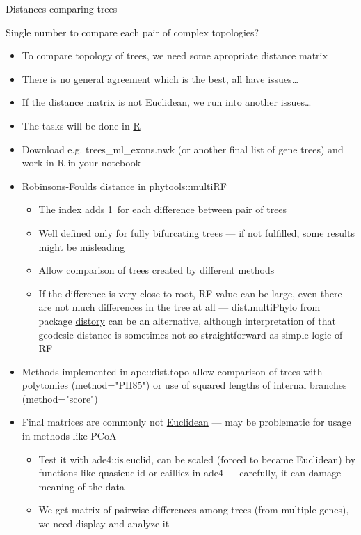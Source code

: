 \documentclass[compress, ucs, xelatex, 11pt, xcolor=x11names, aspectratio=169,
	hyperref={
		bookmarks=true,
		unicode=true,
		colorlinks=true,
		pdftitle={HybSeq course},
		plainpages=false,
		pdfauthor={Vojtech Zeisek},
		pdfsubject={Practical processing of HybSeq target enrichment sequencing data on computing grids like MetaCentrum},
		pdfcreator={XeLaTeX},
		pdfkeywords={BASH, command line, GNU, HybSeq, Linux, MetaCentrum, sequencing shell, target enrichment},
		linkcolor=Cyan2, %
		anchorcolor=Firebrick2, %
		citecolor=Firebrick2, %
		filecolor=Firebrick2, %
		menucolor=Firebrick2, %
		urlcolor=Chartreuse2, %
		pdftex},
	url={hyphens, lowtilde} %
	]{beamer}
\renewcommand{\texttt}[1]{\colorbox{Snow4}{{\ttfamily #1}}}
\begin{document}
\begin{frame}[allowframebreaks]{Distances comparing trees}
	\begin{alertblock}{Single number to compare each pair of complex topologies?}
		\begin{itemize}
			\item To compare topology of trees, we need some apropriate distance matrix
			\item There is no general agreement which is the best, all have issues\ldots
			\item If the distance matrix is not \href{https://en.wikipedia.org/wiki/Euclidean_distance_matrix}{Euclidean}, we run into another issues\ldots
		\end{itemize}
	\end{alertblock}
	\begin{itemize}
		\item The tasks will be done in \href{https://www.r-project.org/}{R}
		\item Download e.g. \texttt{trees\_ml\_exons.nwk} (or another final list of gene trees) and work in \texttt{R} in your notebook
		\item Robinsons-Foulds distance in \texttt{phytools::multiRF}
		\begin{itemize}
			\item The index adds 1~for each difference between pair of trees
			\item Well defined only for fully bifurcating trees --- if not fulfilled, some results might be misleading
			\item Allow comparison of trees created by different methods
			\item If the difference is very close to root, RF value can be large, even there are not much differences in the tree at all --- \texttt{dist.multiPhylo} from package \href{https://CRAN.R-project.org/package=distory}{distory} can be an alternative, although interpretation of that geodesic distance is sometimes not so straightforward as simple logic of RF
		\end{itemize}
		\item Methods implemented in \texttt{ape::dist.topo} allow comparison of trees with polytomies (\texttt{method="PH85"}) or use of squared lengths of internal branches (\texttt{method="score"})
		\item Final matrices are commonly not \href{https://en.wikipedia.org/wiki/Euclidean_distance_matrix}{Euclidean} --- may be problematic for usage in methods like PCoA
		\begin{itemize}
			\item Test it with \texttt{ade4::is.euclid}, can be scaled (forced to became Euclidean) by functions like \texttt{quasieuclid} or \texttt{cailliez} in \texttt{ade4} --- carefully, it can damage meaning of the data
			\item We get matrix of pairwise differences among trees (from multiple genes), we need display and analyze it
		\end{itemize}
	\end{itemize}
\end{frame}
\end{document}

